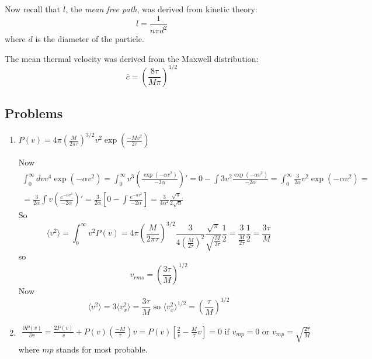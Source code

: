 Now recall that $\overline{l}$, the \emph{mean free path}, was derived from kinetic theory:
\[
l = \frac{1}{n\pi d^2}
\]
where $d$ is the diameter of the particle.  

The mean thermal velocity was derived from the Maxwell distribution:
\[
\overline{c} = \left( \frac{ 8 \tau }{M \pi} \right)^{1/2}
\]





\subsection*{Problems}


\begin{enumerate}
  \item[(a)] $P(v) = 4\pi \left( \frac{M}{2\pi \tau} \right)^{3/2} v^2 \exp{ \left( \frac{-Mv^2}{2\tau} \right) }$

Now
\[
\begin{gathered}
  \int_0^{\infty} dv v^4 \exp{ (-\alpha v^2 )} = \int_0^{\infty} v^3 \left( \frac{ \exp{ (-\alpha v^2) } }{ -2 \alpha } \right)' = 0 - \int 3v^2 \frac{ \exp{ (-\alpha v^2)} }{ -2\alpha } = \int_0^{\infty} \frac{3}{2\alpha} v^2 \exp{ (-\alpha v^2 )} = \\
  = \frac{3}{2\alpha } \int v \left( \frac{e^{-\alpha v^2 }}{ -2\alpha } \right)' = \frac{3}{2\alpha } \left[ 0 - \int \frac{e^{-\alpha v^2 } }{ -2\alpha } \right] = \frac{3}{4\alpha^2 } \frac{ \sqrt{ \pi }}{ 2\sqrt{ \alpha }}
\end{gathered}
\]
So
\[
\langle v^2 \rangle = \int_0^{\infty} v^2 P(v) = 4\pi \left( \frac{M}{2\pi \tau } \right)^{3/2} \frac{3}{4 \left( \frac{M}{2\tau} \right)^2 } \frac{ \sqrt{\pi }}{ \sqrt{ \frac{M}{2\tau} } } \frac{1}{2} = \frac{3}{ \frac{M}{2\tau} } \frac{1}{2} = \frac{3\tau }{M}
\]
so 
\[
\boxed{ v_{rms} = \left( \frac{3\tau}{M} \right)^{1/2} }
\]
Now
\[
\langle v^2 \rangle = 3\langle v_x^2 \rangle = \frac{3\tau}{M} \text{ so } \langle v_x^2 \rangle^{1/2} = \left( \frac{\tau}{M} \right)^{1/2}
\]
  \item[(b)] \[
\begin{gathered}
  \frac{ \partial P(v) }{ \partial v} = \frac{2 P(v)}{v} + P(v) \left( \frac{-M}{\tau} \right)v = P(v) \left[ \frac{2}{v} - \frac{M}{\tau}v \right] = 0  \text{ if } v_{mp} = 0 \text{ or } v_{mp} = \boxed{ \sqrt{ \frac{2\tau}{M} } }
\end{gathered}
\]
where $mp$ stands for most probable.  


\end{enumerate}
